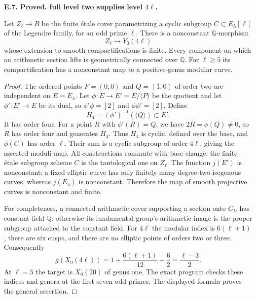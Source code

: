 \documentclass[11pt,oneside]{article}
\makeatletter
\newcounter{statementanchor}
\newenvironment{statement}[3]{%
 \refstepcounter{statementanchor}\def\@currentlabel{#1}%
 \par\addvspace{9pt}\noindent
 \textbf{#1. #2. #3.}\par\nobreak\noindent\ignorespaces
}{\par\addvspace{5pt}}
\makeatother
\begin{document}
\begin{statement}{E.7}{Proved}{full level two supplies level $4\ell$}
\label{st:E.7}
\label{E-level-four}
Let $Z_\ell\to B$ be the finite étale cover parametrizing
a cyclic subgroup $C\subset E_\lambda[\ell]$ of the
Legendre family, for an odd prime $\ell$. There is
a nonconstant $\mathbb Q$-morphism
\[
 Z_\ell\longrightarrow Y_0(4\ell)
\]
whose extension to smooth compactifications is finite.
Every component on which an arithmetic section lifts
is geometrically connected over $\mathbb Q$.
For $\ell\geq5$ its compactification has a
nonconstant map to a positive-genus modular curve.
\end{statement}
\begin{proof}
The ordered points $P=(0,0)$ and $Q=(1,0)$ of order
two are independent on $E=E_\lambda$.
Let $\phi:E\to E'=E/\langle P\rangle$ be the quotient
and let $\phi':E'\to E$ be its dual, so
$\phi'\phi=[2]$ and $\phi\phi'=[2]$.
Define
\[
 H_4=(\phi')^{-1}(\langle Q\rangle)\subset E'.
\]
It has order four. For a point $R$ with
$\phi'(R)=Q$, we have $2R=\phi(Q)\ne0$,
so $R$ has order four and generates $H_4$.
Thus $H_4$ is cyclic, defined over the base, and
$\phi(C)$ has order $\ell$. Their sum is a cyclic
subgroup of order $4\ell$, giving the asserted
moduli map. All constructions commute with
base change; the finite étale subgroup scheme
$C$ is the tautological one on $Z_\ell$.
The function $j(E')$ is nonconstant: a fixed elliptic
curve has only finitely many degree-two isogenous
curves, whereas $j(E_\lambda)$ is nonconstant.
Therefore the map of smooth projective curves
is nonconstant and finite.

For completeness, a connected arithmetic cover
supporting a section onto $G_{\mathbb Q}$ has
constant field $\mathbb Q$: otherwise its
fundamental group's arithmetic image is the
proper subgroup attached to the constant field.
For $4\ell$ the modular index is $6(\ell+1)$,
there are six cusps, and there are no elliptic
points of orders two or three. Consequently
\[
 g(X_0(4\ell))=1+\frac{6(\ell+1)}{12}-\frac62
             =\frac{\ell-3}{2}.
\]
At $\ell=5$ the target is $X_0(20)$ of genus one.
The exact program checks these indices and genera
at the first seven odd primes. The displayed
formula proves the general assertion.
\end{proof}
\end{document}
